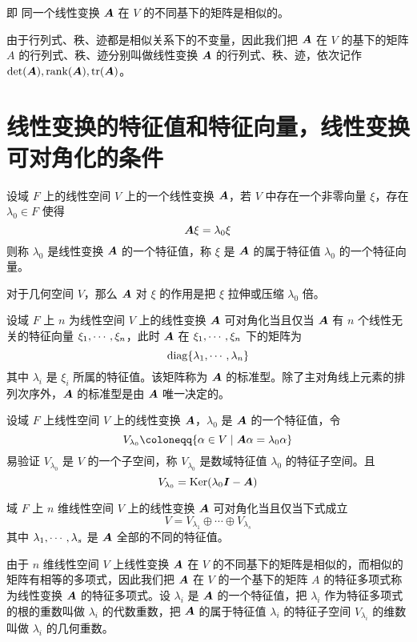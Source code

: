 即 同一个线性变换 $\boldsymbol{A}$ 在 $V$ 的不同基下的矩阵是相似的。

由于行列式、秩、迹都是相似关系下的不变量，因此我们把 $\boldsymbol{A}$ 在 $V$ 的基下的矩阵 $A$ 的行列式、秩、迹分别叫做线性变换 $\boldsymbol{A}$ 的行列式、秩、迹，依次记作 $\det(\boldsymbol{A}),\operatorname{rank}(\boldsymbol{A}),\operatorname{tr}(\boldsymbol{A})$。

\section{线性变换的特征值和特征向量，线性变换可对角化的条件}

\begin{definition}
	设域 $F$ 上的线性空间 $V$ 上的一个线性变换 $\boldsymbol{A}$，若 $V$ 中存在一个非零向量 $\xi$，存在 $\lambda_0 \in F$ 使得
	\[ \boldsymbol{A} \xi = \lambda_0\xi \]
	则称 $\lambda_0$ 是线性变换 $\boldsymbol{A}$ 的一个特征值，称 $\xi$ 是 $\boldsymbol{A}$ 的属于特征值 $\lambda_0$ 的一个特征向量。
\end{definition}

对于几何空间 $V$，那么 $\boldsymbol{A}$ 对 $\xi$ 的作用是把 $\xi$ 拉伸或压缩 $\lambda_0$ 倍。

\begin{theorem}
	设域 $F$ 上 $n$ 为线性空间 $V$ 上的线性变换 $\boldsymbol{A}$ 可对角化当且仅当 $\boldsymbol{A}$ 有 $n$ 个线性无关的特征向量 $\xi_1,\cdots,\xi_n$，此时 $\boldsymbol{A}$ 在 $\xi_1,\cdots,\xi_n$ 下的矩阵为
	\[ \operatorname{diag}\{\lambda_1,\cdots,\lambda_n\} \]
	其中 $\lambda_i$ 是 $\xi_i$ 所属的特征值。该矩阵称为 $\boldsymbol{A}$ 的标准型。除了主对角线上元素的排列次序外，$\boldsymbol{A}$ 的标准型是由 $\boldsymbol{A}$ 唯一决定的。
\end{theorem}

设域 $F$ 上线性空间 $V$ 上的线性变换 $\boldsymbol{A}$，$\lambda_0$ 是 $\boldsymbol{A}$ 的一个特征值，令
\[ V_{\lambda_0} \coloneqq \{ \alpha \in V \mid \vbf{A}\alpha = \lambda_0\alpha \} \]
易验证 $V_{\lambda_0}$ 是 $V$ 的一个子空间，称 $V_{\lambda_0}$ 是数域特征值 $\lambda_0$ 的特征子空间。且
\[ V_{\lambda_0} = \operatorname{Ker}(\lambda_0\boldsymbol{I} - \boldsymbol{A}) \]

\begin{proposition}
	域 $F$ 上 $n$ 维线性空间 $V$ 上的线性变换 $\boldsymbol{A}$ 可对角化当且仅当下式成立
	\[ V = V_{\lambda_1} \oplus \cdots \oplus V_{\lambda_s} \]
	其中 $\lambda_1,\cdots,\lambda_s$ 是 $\boldsymbol{A}$ 全部的不同的特征值。
\end{proposition}

由于 $n$ 维线性空间 $V$ 上线性变换 $\boldsymbol{A}$ 在 $V$ 的不同基下的矩阵是相似的，而相似的矩阵有相等的多项式，因此我们把 $\boldsymbol{A}$ 在 $V$ 的一个基下的矩阵 $A$ 的特征多项式称为线性变换 $\boldsymbol{A}$ 的特征多项式。设 $\lambda_i$ 是 $\boldsymbol{A}$ 的一个特征值，把 $\lambda_i$ 作为特征多项式的根的重数叫做 $\lambda_i$ 的代数重数，把 $\boldsymbol{A}$ 的属于特征值 $\lambda_i$ 的特征子空间 $V_{\lambda_i}$ 的维数叫做 $\lambda_i$ 的几何重数。 

